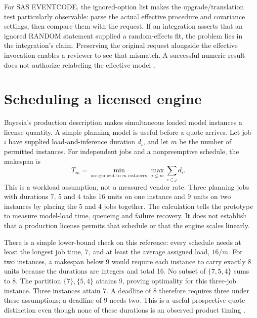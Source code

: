 For SAS EVENTCODE, the ignored-option list makes the upgrade/translation test
particularly observable: parse the actual effective procedure and covariance
settings, then compare them with the request. If an integration asserts that
an ignored RANDOM statement supplied a random-effects fit, the problem lies
in the integration's claim. Preserving the original request alongside the
effective invocation enables a reviewer to see that mismatch. A successful
numeric result does not authorize relabeling the effective model
\citep{exec14_survival_sas}.

\section{Scheduling a licensed engine}
\label{exec17:s8-scheduling}

Bayesia's production description makes simultaneous loaded model instances a
license quantity. A simple planning model is useful before a quote arrives.
Let job $i$ have supplied load-and-inference duration $d_i$, and let $m$ be the
number of permitted instances. For independent jobs and a nonpreemptive
schedule, the makespan is
\begin{equation}
 T_m=\min_{\text{assignment to }m\text{ instances}}
       \max_{j\leq m}\sum_{i\in j}d_i.
 \label{exec17:s8-makespan}
\end{equation}
This is a workload assumption, not a measured vendor rate. Three planning jobs
with durations 7, 5 and 4 take 16 units on one instance and 9 units on two
instances by placing the 5 and 4 jobs together. The calculation tells the
prototype to measure model-load time, queueing and failure recovery. It does
not establish that a production license permits that schedule or that the
engine scales linearly.

There is a simple lower-bound check on this reference: every schedule needs
at least the longest job time, 7, and at least the average assigned load,
$16/m$. For two instances, a makespan below 9 would require each instance to
carry exactly 8 units because the durations are integers and total 16. No
subset of $\{7,5,4\}$ sums to 8. The partition $\{7\},\{5,4\}$ attains 9,
proving optimality for this three-job instance. Three instances attain 7.
A deadline of 8 therefore requires three under these assumptions; a deadline
of 9 needs two. This is a useful prospective quote distinction even though
none of these durations is an observed product timing
\citep{exec17_s8_examples}.

